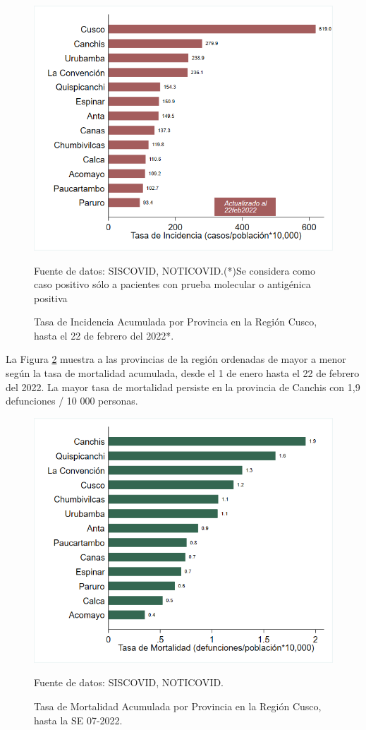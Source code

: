 \documentclass[12pt,a4paper,openany]{book}
\begin{document}
\begin{figure}[!htpb]
	\caption{Tasa de Incidencia Acumulada por Provincia en la Región Cusco, hasta el 22 de febrero del 2022*. }\label{fig:incidencia_provincias}
	\begin{center}
		\includegraphics[width=0.75\linewidth]{../figuras/incidencia_provincial_2022.png}
	\end{center}
	{\footnotesize {
	Fuente de datos: SISCOVID, NOTICOVID.(*)Se considera como caso positivo sólo a pacientes con prueba molecular o antigénica positiva}}
\end{figure}


La Figura \ref{fig:mortalidad_ordenada} muestra a las provincias de la región ordenadas de mayor a menor según la tasa de mortalidad acumulada, desde el 1 de enero hasta el 22 de febrero del 2022. La mayor tasa de mortalidad persiste en la provincia de Canchis con 1,9 defunciones / 10 000 personas.   

\begin{figure}[h]
	\caption{Tasa de Mortalidad Acumulada por Provincia en la Región Cusco, hasta la SE 07-2022. }\label{fig:mortalidad_ordenada}
	\begin{center}
		\includegraphics[width=0.65\linewidth]{../figuras/mortalidad_provincial_2022.png}
	\end{center}
	{\footnotesize {Fuente de datos: SISCOVID, NOTICOVID.}}
\end{figure}
\end{document}

